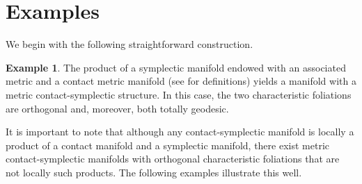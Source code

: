 \documentclass[12pt]{amsart}
\theoremstyle{definition}
\newtheorem{example}[theorem]{Example}
\theoremstyle{remark}
\begin{document}
\section{Examples}
\noindent  
We begin with the following straightforward construction.

\begin{example}
The product of a symplectic manifold endowed with an associated metric and a contact metric manifold (see \cite{Blairbook} for definitions) yields a manifold with a metric contact-symplectic structure. 
In this case, the two characteristic foliations are orthogonal and, moreover, both totally geodesic.
\end{example}

\noindent
It is important to note that although any contact-symplectic manifold is locally a product of a contact manifold and a symplectic manifold, there exist metric contact-symplectic manifolds with orthogonal characteristic foliations that are not locally such products.
The following examples illustrate this well.
\end{document}
